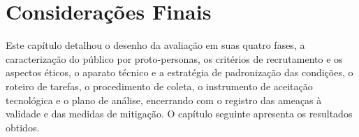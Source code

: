 \section{Considerações Finais}
\label{sec:met_finais}

Este capítulo detalhou o desenho da avaliação em suas quatro fases, a
caracterização do público por proto-personas, os critérios de recrutamento e os
aspectos éticos, o aparato técnico e a estratégia de padronização das condições, o
roteiro de tarefas, o procedimento de coleta, o instrumento de aceitação
tecnológica e o plano de análise, encerrando com o registro das ameaças à validade
e das medidas de mitigação. O capítulo seguinte apresenta os resultados obtidos.
